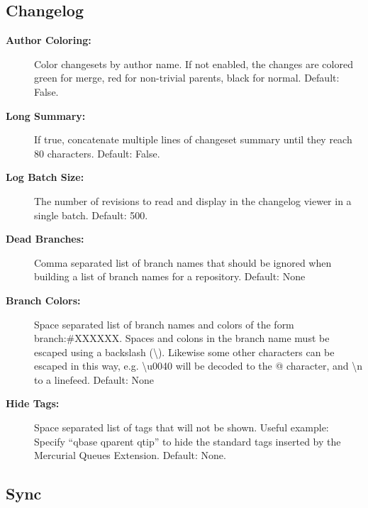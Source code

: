 \documentclass[letterpaper,10pt,english]{manual}
\begin{document}
\subsection{Changelog}
\begin{description}
\item[\textbf{Author Coloring:}]
Color changesets by author name.  If not enabled,
the changes are colored green for merge, red for
non-trivial parents, black for normal.
Default: False.

\item[\textbf{Long Summary:}]
If true, concatenate multiple lines of changeset summary
until they reach 80 characters.
Default: False.

\item[\textbf{Log Batch Size:}]
The number of revisions to read and display in the
changelog viewer in a single batch.
Default: 500.

\item[\textbf{Dead Branches:}]
Comma separated list of branch names that should be ignored when
building a list of branch names for a repository.  Default: None

\item[\textbf{Branch Colors:}]
Space separated list of branch names and colors of the form
branch:\#XXXXXX. Spaces and colons in the branch name must be escaped
using a backslash (\textbackslash{}). Likewise some other characters can be
escaped in this way, e.g. \textbackslash{}u0040 will be decoded to the @
character, and \textbackslash{}n to a linefeed.  Default: None

\item[\textbf{Hide Tags:}]
Space separated list of tags that will not be shown.
Useful example: Specify ``qbase qparent qtip'' to hide the
standard tags inserted by the Mercurial Queues Extension.
Default: None.

\end{description}
\hypertarget{module-synchronize.settings}{}

\subsection{Sync}
\end{document}
